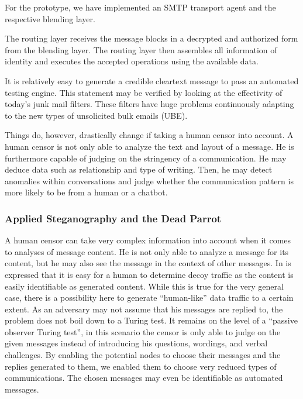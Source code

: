 \documentclass[10pt,journal,compsoc,twocolumn,twoside]{IEEEtran}
\begin{document}
For the prototype, we have implemented an SMTP transport agent and the respective blending layer.

The routing layer receives the message blocks in a decrypted and authorized form from the blending layer. The routing layer then assembles all information of identity and executes the accepted operations using the available data. 

It is relatively easy to generate a credible cleartext message to pass an automated testing engine. This statement may be verified by looking at the effectivity of today's junk mail filters. These filters have huge problems continuously adapting to the new types of unsolicited bulk emails (UBE).

Things do, however, drastically change if taking a human censor into account. A human censor is not only able to analyze the text and layout of a message. He is furthermore capable of judging on the stringency of a communication. He may deduce data such as relationship and type of writing. Then, he may detect anomalies within conversations and judge whether the communication pattern is more likely to be from a human or a chatbot.

\subsubsection{Applied Steganography and the Dead Parrot}
A human censor can take very complex information into account when it comes to analyses of message content. He is not only able to analyze a message for its content, but he may also see the message in the context of other messages. In \cite{oakland2013-parrot} is expressed that it is easy for a human to determine decoy traffic as the content is easily identifiable as generated content. While this is true for the very general case, there is a possibility here to generate ``human-like'' data traffic to a certain extent. As an adversary may not assume that his messages are replied to, the problem does not boil down to a Turing test. It remains on the level of a ``passive observer Turing test'', in this scenario the censor is only able to judge on the given messages instead of introducing his questions, wordings, and verbal challenges. By enabling the potential nodes to choose their messages and the replies generated to them, we enabled them to choose very reduced types of communications. The chosen messages may even be identifiable as automated messages. 
\end{document}
